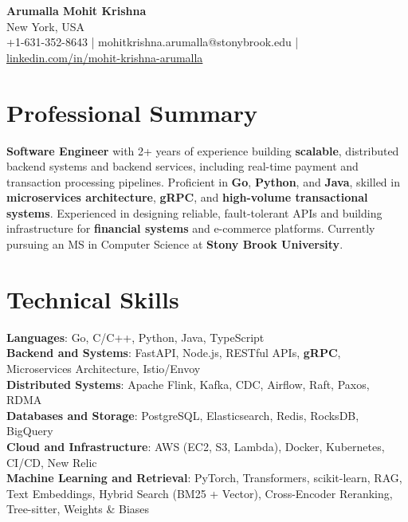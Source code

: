 \documentclass[letterpaper,11pt]{article}
\begin{document}
\begin{center}
  {\Large \textbf{Arumalla Mohit Krishna}} \\
  New York, USA \\
  +1-631-352-8643 \enspace | \enspace mohitkrishna.arumalla@stonybrook.edu \enspace | \enspace \href{https://www.linkedin.com/in/mohit-krishna-arumalla}{linkedin.com/in/mohit-krishna-arumalla}
\end{center}

\section{Professional Summary}
  \begin{itemize}[leftmargin=0.15in, label={}]
    \small{\item{
     \textbf{Software Engineer} with 2+ years of experience building \textbf{scalable}, distributed backend systems and backend services, including real-time payment and transaction processing pipelines. Proficient in \textbf{Go}, \textbf{Python}, and \textbf{Java}, skilled in \textbf{microservices architecture}, \textbf{gRPC}, and \textbf{high-volume transactional systems}. Experienced in designing reliable, fault-tolerant APIs and building infrastructure for \textbf{financial systems} and e-commerce platforms. Currently pursuing an MS in Computer Science at \textbf{Stony Brook University}.
    }}
  \end{itemize}
\vspace{-16pt}

\section{Technical Skills}
 \begin{itemize}[leftmargin=0.15in, label={}]
    \small{\item{
     \textbf{Languages}: Go, C/C++, Python, Java, TypeScript \\
     \textbf{Backend and Systems}: FastAPI, Node.js, RESTful APIs, \textbf{gRPC}, Microservices Architecture, Istio/Envoy \\
     \textbf{Distributed Systems}: Apache Flink, Kafka, CDC, Airflow, Raft, Paxos, RDMA \\
     \textbf{Databases and Storage}: PostgreSQL, Elasticsearch, Redis, RocksDB, BigQuery \\
     \textbf{Cloud and Infrastructure}: AWS (EC2, S3, Lambda), Docker, Kubernetes, CI/CD, New Relic \\
     \textbf{Machine Learning and Retrieval}: PyTorch, Transformers, scikit-learn, RAG, Text Embeddings, Hybrid Search (BM25 + Vector), Cross-Encoder Reranking, Tree-sitter, Weights \& Biases
    }}
 \end{itemize}
\vspace{-16pt}
\end{document}
